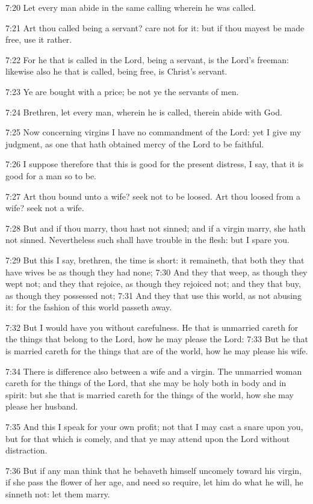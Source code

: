 7:20 Let every man abide in the same calling wherein he was called.

7:21 Art thou called being a servant? care not for it: but if thou
mayest be made free, use it rather.

7:22 For he that is called in the Lord, being a servant, is the Lord's
freeman: likewise also he that is called, being free, is Christ's
servant.

7:23 Ye are bought with a price; be not ye the servants of men.

7:24 Brethren, let every man, wherein he is called, therein abide with
God.

7:25 Now concerning virgins I have no commandment of the Lord: yet I
give my judgment, as one that hath obtained mercy of the Lord to be
faithful.

7:26 I suppose therefore that this is good for the present distress, I
say, that it is good for a man so to be.

7:27 Art thou bound unto a wife? seek not to be loosed. Art thou
loosed from a wife? seek not a wife.

7:28 But and if thou marry, thou hast not sinned; and if a virgin
marry, she hath not sinned. Nevertheless such shall have trouble in
the flesh: but I spare you.

7:29 But this I say, brethren, the time is short: it remaineth, that
both they that have wives be as though they had none; 7:30 And they
that weep, as though they wept not; and they that rejoice, as though
they rejoiced not; and they that buy, as though they possessed not;
7:31 And they that use this world, as not abusing it: for the fashion
of this world passeth away.

7:32 But I would have you without carefulness. He that is unmarried
careth for the things that belong to the Lord, how he may please the
Lord: 7:33 But he that is married careth for the things that are of
the world, how he may please his wife.

7:34 There is difference also between a wife and a virgin. The
unmarried woman careth for the things of the Lord, that she may be
holy both in body and in spirit: but she that is married careth for
the things of the world, how she may please her husband.

7:35 And this I speak for your own profit; not that I may cast a snare
upon you, but for that which is comely, and that ye may attend upon
the Lord without distraction.

7:36 But if any man think that he behaveth himself uncomely toward his
virgin, if she pass the flower of her age, and need so require, let
him do what he will, he sinneth not: let them marry.

